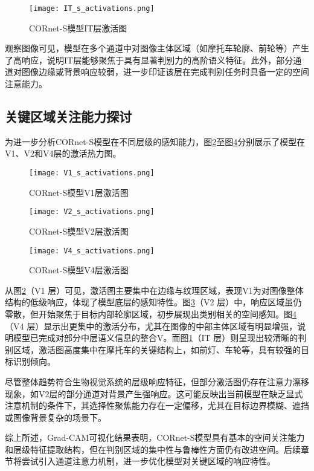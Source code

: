 \begin{figure}[hbt]
	\centering
	\texttt{[image: IT\_s\_activations.png]}
	\caption{CORnet-S模型IT层激活图}
	\label{f.it_s_act}
\end{figure}

观察图像可见，模型在多个通道中对图像主体区域（如摩托车轮廓、前轮等）产生了高响应，说明IT层能够聚焦于具有显著判别力的高阶语义特征。此外，部分通道对图像边缘或背景响应较弱，进一步印证该层在完成判别任务时具备一定的空间注意能力。

\subsection{关键区域关注能力探讨}

为进一步分析CORnet-S模型在不同层级的感知能力，图\ref{f.v1_s_act}至图\ref{f.v4_s_act}分别展示了模型在V1、V2和V4层的激活热力图。

\begin{figure}[hbt]
	\centering
	\texttt{[image: V1\_s\_activations.png]}
	\caption{CORnet-S模型V1层激活图}
	\label{f.v1_s_act}
\end{figure}

\begin{figure}[hbt]
	\centering
	\texttt{[image: V2\_s\_activations.png]}
	\caption{CORnet-S模型V2层激活图}
	\label{f.v2_s_act}
\end{figure}

\begin{figure}[hbt]
	\centering
	\texttt{[image: V4\_s\_activations.png]}
	\caption{CORnet-S模型V4层激活图}
	\label{f.v4_s_act}
\end{figure}

从图\ref{f.v1_s_act}（V1 层）可见，激活图主要集中在边缘与纹理区域，表现V1为对图像整体结构的低级响应，体现了模型底层的感知特性。图\ref{f.v2_s_act}（V2 层）中，响应区域虽仍零散，但开始聚焦于目标内部轮廓区域，初步展现出类别相关的空间感知。图\ref{f.v4_s_act}（V4 层）显示出更集中的激活分布，尤其在图像的中部主体区域有明显增强，说明模型已完成对部分中层语义信息的整合V。而图\ref{f.it_s_act}（IT 层）则呈现出较清晰的判别区域，激活图高度集中在摩托车的关键结构上，如前灯、车轮等，具有较强的目标识别倾向。

尽管整体趋势符合生物视觉系统的层级响应特征，但部分激活图仍存在注意力漂移现象，如V2层的部分通道对背景产生强响应。这可能反映出当前模型在缺乏显式注意机制的条件下，其选择性聚焦能力存在一定偏移，尤其在目标边界模糊、遮挡或图像背景复杂的场景下。

综上所述，Grad-CAM可视化结果表明，CORnet-S模型具有基本的空间关注能力和层级特征提取结构，但在判别区域的集中性与鲁棒性方面仍有改进空间。后续章节将尝试引入通道注意力机制，进一步优化模型对关键区域的响应特性。


